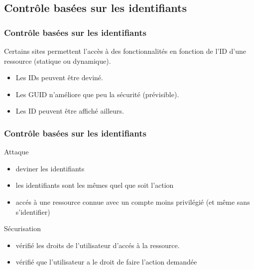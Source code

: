 \documentclass{beamer}
\begin{document}
\subsection{Contrôle basées sur les identifiants}
\begin{frame}
  \frametitle{Contrôle basées sur les identifiants}
  Certains sites permettent l'accès à des fonctionnalités en fonction de l'ID d'une ressource (statique ou dynamique).
  \begin{itemize}
    \item Les IDs peuvent être deviné.
    \item Les GUID n'améliore que peu la sécurité (prévisible).
    \item Les ID peuvent être affiché ailleurs.
  \end{itemize}
\end{frame}
\begin{frame}
  \frametitle{Contrôle basées sur les identifiants}
  \begin{alertblock}{Attaque}
    \begin{itemize}
      \item deviner les identifiants
      \item les identifiants sont les mêmes quel que soit l’action
      \item accés à une ressource connue avec un compte moins privilégié (et même sans s'identifier)
    \end{itemize}
  \end{alertblock}
  \begin{exampleblock}{Sécurisation}
    \begin{itemize}
      \item vérifié les droits de l'utilisateur d'accés à la ressource.
      \item vérifié que l'utilisateur a le droit de faire l'action demandée
    \end{itemize}
  \end{exampleblock}
\end{frame}
\end{document}
